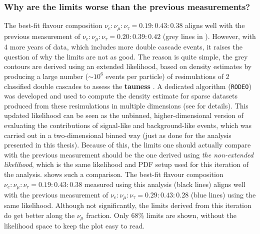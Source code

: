 \subsubsection{Why are the limits worse than the previous measurements?}

The best-fit flavour composition $\nu_e:\nu_{\mu}:\nu_{\tau} = 0.19:0.43:0.38$ aligns well with the previous measurement  of $\nu_e:\nu_{\mu}:\nu_{\tau} = 0.20:0.39:0.42$ (grey lines in ). However, with 4 more years of data, which includes more double cascade events, it raises the question of why the limits are not as good. The reason is quite simple, the grey contours are derived using an extended likelihood, based on density estimates by producing a large number ($\sim10^6$ events per particle) of resimulations of 2 classified double cascades to assess the \textbf{tauness} . A dedicated algorithm (\texttt{RODEO}) was developed and used to compute the density estimate for sparse datasets produced from these resimulations in multiple dimensions (see  for details). This updated likelihood can be seen as the unbinned, higher-dimensional version of evaluating the contributions of signal-like and background-like events, which was carried out in a two-dimensional binned way (just as done for the analysis presented in this thesis).  Because of this, the limits one should actually compare with the previous measurement should be the one derived using \emph{the non-extended likelihood}, which is the same likelihood and PDF setup used for this iteration of the analysis.  shows such a comparison. The best-fit flavour composition $\nu_e:\nu_{\mu}:\nu_{\tau} = 0.19:0.43:0.38$ measured using this analysis (black lines) aligns well with the previous measurement of $\nu_e:\nu_{\mu}:\nu_{\tau} = 0.29:0.43:0.28$ (blue lines) using the same likelihood. Although not significantly, the limits derived from this iteration do get better along the $\nu_{\mu}$ fraction. Only 68\% limits are shown, without the likelihood space to keep the plot easy to read.


